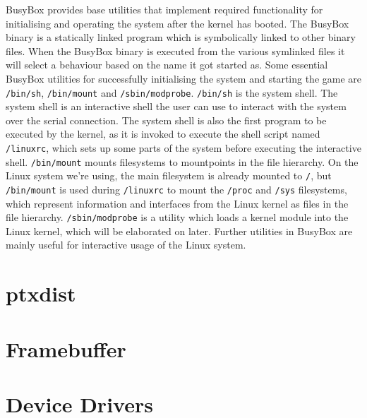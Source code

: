 BusyBox provides base utilities that implement required functionality for
initialising and operating the system after the kernel has booted. The BusyBox
binary is a statically linked program which is symbolically linked to other
binary files. When the BusyBox binary is executed from the various symlinked
files it will select a behaviour based on the name it got started as. Some
essential BusyBox utilities for successfully initialising the system and
starting the game are \texttt{/bin/sh}, \texttt{/bin/mount} and
\texttt{/sbin/modprobe}. \texttt{/bin/sh} is the system shell. The system shell is
an interactive shell the user can use to interact with the system over the
serial connection. The system shell is also the first program to be executed by
the kernel, as it is invoked to execute the shell script named
\texttt{/linuxrc}, which sets up some parts of the system before executing the
interactive shell. \texttt{/bin/mount} mounts filesystems to mountpoints in the
file hierarchy. On the Linux system we're using, the main filesystem is already
mounted to \texttt{/}, but \texttt{/bin/mount} is used during \texttt{/linuxrc}
to mount the \texttt{/proc} and \texttt{/sys} filesystems, which represent
information and interfaces from the Linux kernel as files in the file hierarchy.
\texttt{/sbin/modprobe} is a utility which loads a kernel module into the Linux
kernel, which will be elaborated on later. Further utilities in BusyBox are
mainly useful for interactive usage of the Linux system.

\section{ptxdist}

\section{Framebuffer}

\section{Device Drivers}
